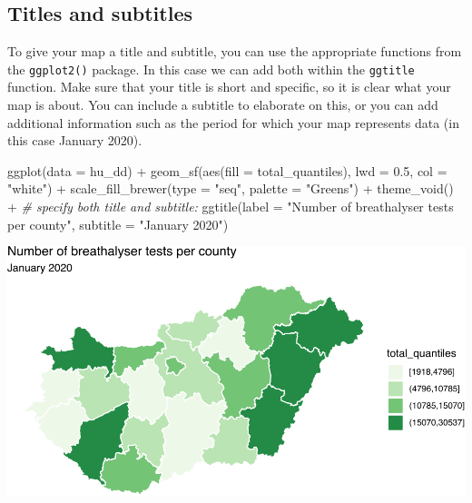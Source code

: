 \documentclass[
]{book}
\newenvironment{Shaded}{\begin{snugshade}}{\end{snugshade}}
\newcommand{\AttributeTok}[1]{\textcolor[rgb]{0.77,0.63,0.00}{#1}}
\newcommand{\CommentTok}[1]{\textcolor[rgb]{0.56,0.35,0.01}{\textit{#1}}}
\newcommand{\FloatTok}[1]{\textcolor[rgb]{0.00,0.00,0.81}{#1}}
\newcommand{\FunctionTok}[1]{\textcolor[rgb]{0.00,0.00,0.00}{#1}}
\newcommand{\NormalTok}[1]{#1}
\newcommand{\SpecialCharTok}[1]{\textcolor[rgb]{0.00,0.00,0.00}{#1}}
\newcommand{\StringTok}[1]{\textcolor[rgb]{0.31,0.60,0.02}{#1}}
\begin{document}
\hypertarget{titles-and-subtitles}{%
\subsection{Titles and subtitles}\label{titles-and-subtitles}}

To give your map a title and subtitle, you can use the appropriate functions from the \texttt{ggplot2()} package. In this case we can add both within the \texttt{ggtitle} function. Make sure that your title is short and specific, so it is clear what your map is about. You can include a subtitle to elaborate on this, or you can add additional information such as the period for which your map represents data (in this case January 2020).

\begin{Shaded}
\begin{Highlighting}[]
\FunctionTok{ggplot}\NormalTok{(}\AttributeTok{data =}\NormalTok{ hu\_dd) }\SpecialCharTok{+} 
  \FunctionTok{geom\_sf}\NormalTok{(}\FunctionTok{aes}\NormalTok{(}\AttributeTok{fill =}\NormalTok{ total\_quantiles), }
          \AttributeTok{lwd =} \FloatTok{0.5}\NormalTok{, }\AttributeTok{col =} \StringTok{"white"}\NormalTok{) }\SpecialCharTok{+} 
  \FunctionTok{scale\_fill\_brewer}\NormalTok{(}\AttributeTok{type =} \StringTok{"seq"}\NormalTok{, }\AttributeTok{palette =} \StringTok{"Greens"}\NormalTok{) }\SpecialCharTok{+} 
  \FunctionTok{theme\_void}\NormalTok{() }\SpecialCharTok{+} 
  \CommentTok{\# specify both title and subtitle: }
  \FunctionTok{ggtitle}\NormalTok{(}\AttributeTok{label =} \StringTok{"Number of breathalyser tests per county"}\NormalTok{, }
          \AttributeTok{subtitle =} \StringTok{"January 2020"}\NormalTok{)}
\end{Highlighting}
\end{Shaded}

\includegraphics{crime_mapping_files/figure-latex/titlesubtitle-1.pdf}
\end{document}

